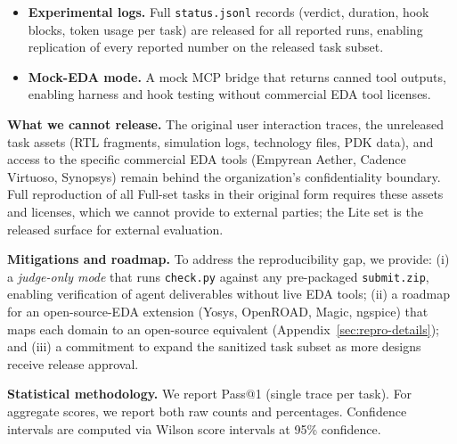 \begin{itemize}
    \item \textbf{Experimental logs.} Full \texttt{status.jsonl} records (verdict, duration, hook blocks, token usage per task) are released for all reported runs, enabling replication of every reported number on the released task subset.
    \item \textbf{Mock-EDA mode.} A mock MCP bridge that returns canned tool outputs, enabling harness and hook testing without commercial EDA tool licenses.
\end{itemize}

\textbf{What we cannot release.} The original user interaction traces, the unreleased task assets (RTL fragments, simulation logs, technology files, PDK data), and access to the specific commercial EDA tools (Empyrean Aether, Cadence Virtuoso, Synopsys) remain behind the organization's confidentiality boundary. Full reproduction of all \Ntasks{} Full-set tasks in their original form requires these assets and licenses, which we cannot provide to external parties; the Lite set is the released surface for external evaluation.

\textbf{Mitigations and roadmap.} To address the reproducibility gap, we provide: (i) a \emph{judge-only mode} that runs \texttt{check.py} against any pre-packaged \texttt{submit.zip}, enabling verification of agent deliverables without live EDA tools; (ii) a roadmap for an open-source-EDA extension (Yosys, OpenROAD, Magic, ngspice) that maps each domain to an open-source equivalent (Appendix~\ref{sec:repro-details}); and (iii) a commitment to expand the sanitized task subset as more designs receive release approval.

\textbf{Statistical methodology.} We report Pass@1 (single trace per task). For aggregate scores, we report both raw counts and percentages. Confidence intervals are computed via Wilson score intervals at 95\% confidence.
